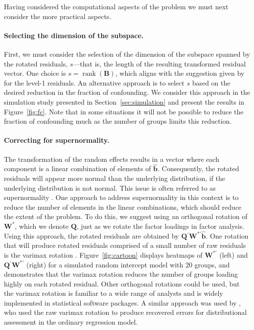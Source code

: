 \documentclass[12pt]{article} %
\newcommand{\al}[1]{{\color{red} #1}}
\newcommand{\ginv}{\ensuremath{^{-}}}
\newcommand{\trans}{\ensuremath{^\prime}}
\DeclareMathOperator{\rank}{rank}
\begin{document}
Having considered the computational aspects of the problem we must next consider the more practical aspects. 

\paragraph{Selecting the dimension of the subspace.}
First, we must consider the selection of the dimension of the subspace spanned by the rotated residuals, $s$---that is, the length of the resulting transformed residual vector. One choice is $s = \rank(\bm{B})$, which aligns with the suggestion given by \cite{HildenMinton:1995wh} for the level-1 residuals. 
An alternative approach is to select $s$ based on the desired reduction in the fraction of confounding. 
We consider this approach in the simulation study presented in Section~\ref{sec:simulation} and present the results in Figure~\ref{fig:fc}. Note that in some situations it will not be possible to reduce the fraction of confounding much as the number of groups limits this reduction.

\paragraph{Correcting for supernormality.}
The transformation of the random effects results in a vector where each component is a linear combination of elements of $\widehat{\bm{b}}$. Consequently, the rotated residuals will appear more normal than the underlying distribution, if the underlying distribution is not normal. This issue is often referred to as supernormality \citep{Atkinson:1985}. One approach to address supernormality in this context is to reduce the number of elements in the linear combinations, which should reduce the extent of the problem. To do this, we suggest using an orthogonal rotation of $\bm{W}^*$, which we denote $\bm{Q}$, just as we rotate the factor loadings in factor analysis. Using this approach, the rotated residuals are obtained by $\bm{Q}\trans \bm{W}^{*\prime} \widehat{\bm{b}}$. One rotation that will produce rotated residuals comprised of a small number of raw residuals is the varimax rotation \citep{Johnson:2007}. Figure~\ref{fig:cartoon} displays heatmaps of $\bm{W}^{*\prime}$ (left) and $\bm{Q}\trans\bm{W}^{*\prime}$ (right) for a simulated random intercept model with 20 groups, and demonstrates that the varimax rotation reduces the number of groups loading highly on each rotated residual.  Other orthogonal rotations could be used, but the varimax rotation is familiar to a wide range of analysts and is widely implemented in statistical software packages. A similar approach was used by \cite{Jensen:1999iu}, who used the raw varimax rotation to produce recovered errors for distributional assessment in the ordinary regression model.
\end{document}
